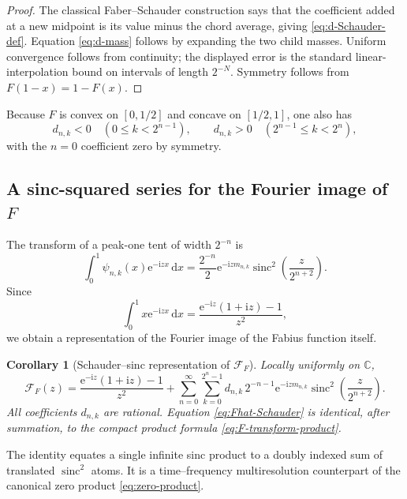 \documentclass[11pt,oneside]{article}
\newtheorem{corollary}[theorem]{Corollary}
\theoremstyle{definition}
\theoremstyle{remark}
\newcommand{\C}{\mathbb C}
\newcommand{\sinc}{\operatorname{sinc}}
\newcommand{\e}{\mathrm e}
\newcommand{\ii}{\mathrm i}
\newcommand{\dd}{\,\mathrm d}
\begin{document}
\begin{proof}
The classical Faber--Schauder construction says that the coefficient added at a
new midpoint is its value minus the chord average, giving
\eqref{eq:d-Schauder-def}.  Equation \eqref{eq:d-mass} follows by expanding the
two child masses.  Uniform convergence follows from continuity; the displayed
error is the standard linear-interpolation bound on intervals of length
$2^{-N}$.  Symmetry follows from $F(1-x)=1-F(x)$.
\end{proof}

Because $F$ is convex on $[0,1/2]$ and concave on $[1/2,1]$, one also has
\begin{equation}\label{eq:d-sign}
 d_{n,k}<0\quad(0\le k<2^{n-1}),
 \qquad
 d_{n,k}>0\quad(2^{n-1}\le k<2^n),
\end{equation}
with the $n=0$ coefficient zero by symmetry.

\subsection{A sinc-squared series for the Fourier image of $F$}

The transform of a peak-one tent of width $2^{-n}$ is
\begin{equation}\label{eq:tent-transform}
 \int_0^1\psi_{n,k}(x)\e^{-\ii zx}\dd x
 =\frac{2^{-n}}{2}\e^{-\ii z m_{n,k}}
 \sinc^2\!\left(\frac{z}{2^{n+2}}\right).
\end{equation}
Since
\begin{equation}\label{eq:x-transform}
 \int_0^1x\e^{-\ii zx}\dd x
 =\frac{\e^{-\ii z}(1+\ii z)-1}{z^2},
\end{equation}
we obtain a representation of the Fourier image of the Fabius function itself.

\begin{corollary}[Schauder--sinc representation of $\mathscr F_F$]
\label{cor:Fhat-Schauder}
Locally uniformly on $\C$,
\begin{equation}\label{eq:Fhat-Schauder}
 \mathscr F_F(z)
 =\frac{\e^{-\ii z}(1+\ii z)-1}{z^2}
 +\sum_{n=0}^\infty\sum_{k=0}^{2^n-1}
 d_{n,k}\,2^{-n-1}\e^{-\ii z m_{n,k}}
 \sinc^2\!\left(\frac{z}{2^{n+2}}\right).
\end{equation}
All coefficients $d_{n,k}$ are rational.  Equation
\eqref{eq:Fhat-Schauder} is identical, after summation, to the compact product
formula \eqref{eq:F-transform-product}.
\end{corollary}

The identity equates a single infinite sinc product to a doubly indexed sum of
translated $\sinc^2$ atoms.  It is a time--frequency multiresolution counterpart
of the canonical zero product \eqref{eq:zero-product}.
\end{document}
